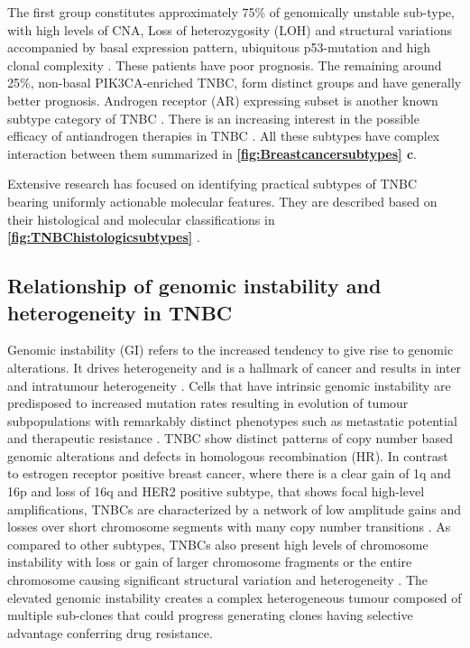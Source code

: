 The first group constitutes approximately 75\% of genomically unstable sub-type, with high levels of \ac{CNA}, Loss of heterozygosity (LOH) and structural variations accompanied by basal expression pattern, ubiquitous p53-mutation and high clonal complexity \cite{shah2012clonal, garrido2019insights}. These patients have poor prognosis. The remaining around 25\%, non-basal PIK3CA-enriched TNBC, form distinct groups and have generally better prognosis. Androgen receptor (AR) expressing subset is another known subtype category of TNBC \cite{tang2012expression, rakha2007prognostic,mrklic2013expression}. There is an increasing interest in the possible efficacy of antiandrogen therapies in TNBC \cite{gerratana2018androgen,gucalp2013phase}.
All these subtypes have complex interaction between them summarized in \textbf{\autoref{fig:Breastcancersubtypes} c}.


Extensive research has focused on identifying practical subtypes of TNBC bearing uniformly actionable molecular features. They are described based on their histological and molecular classifications in \textbf{\autoref{fig:TNBChistologicsubtypes}} \cite{weigelt2009histological,bianchini2016triple}. 

\subsection{Relationship of genomic instability and heterogeneity in TNBC}
Genomic instability (GI) refers to the increased tendency to give rise to genomic alterations. It drives heterogeneity and is a hallmark of cancer and results in inter and intratumour heterogeneity \cite{hanahan2011hallmarks}.
 Cells that have intrinsic genomic instability are predisposed to increased mutation rates resulting in evolution of tumour subpopulations with remarkably distinct phenotypes such as metastatic potential and therapeutic resistance \cite{fidler1978tumor, burrell2013causes,januvskevivciene2019heterogeneity}.
TNBC show distinct patterns of copy number based genomic alterations and defects in homologous recombination (HR).
In contrast to estrogen receptor positive breast cancer, where there is a clear gain of 1q and 16p and loss of 16q and HER2 positive subtype, that shows focal high-level amplifications, TNBCs are characterized by a network of low amplitude gains and losses over short chromosome segments with many copy number transitions \cite{kwei2010genomic}.
As compared to other subtypes, TNBCs also present high levels of chromosome instability with loss or gain of larger chromosome fragments or the entire chromosome causing significant structural variation and heterogeneity \cite{lee2016mechanisms}.
The elevated genomic instability creates a complex heterogeneous tumour composed of multiple sub-clones that could progress generating clones having selective advantage conferring drug resistance. 

